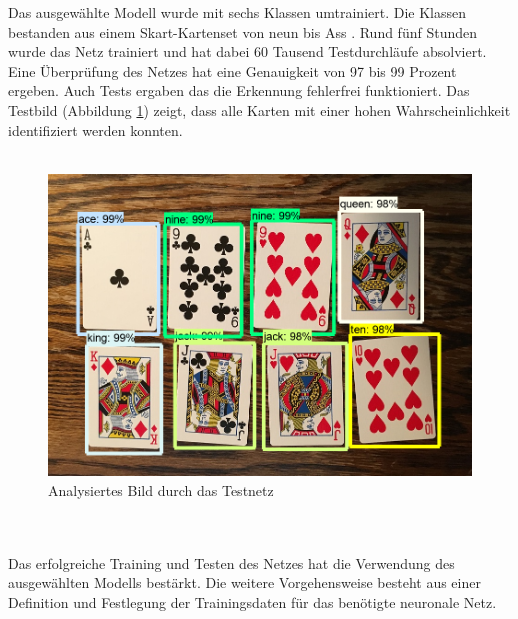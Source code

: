\documentclass[a4paper,12pt,oneside]{article}
\begin{document}
Das ausgewählte Modell wurde mit sechs Klassen umtrainiert. Die Klassen bestanden aus einem Skart-Kartenset von neun bis Ass \cite{evan2018pic}. Rund fünf Stunden wurde das Netz trainiert und hat dabei 60 Tausend Testdurchläufe absolviert. Eine Überprüfung des Netzes hat eine Genauigkeit von 97 bis 99 Prozent ergeben. Auch Tests ergaben das die Erkennung fehlerfrei funktioniert. Das Testbild (Abbildung \ref{img:Kartenset}) zeigt, dass alle Karten mit einer hohen Wahrscheinlichkeit identifiziert werden konnten.
\\
\\
\begin{figure}
    [h]
	\centering
	\includegraphics[scale=0.5]{Sources/kartenset.png}
	\caption{Analysiertes Bild durch das Testnetz}
	\label{img:Kartenset}
\end{figure}
\\
\\
Das erfolgreiche Training und Testen des Netzes hat die Verwendung des ausgewählten Modells bestärkt. Die weitere Vorgehensweise besteht aus einer Definition und Festlegung der Trainingsdaten für das benötigte neuronale Netz. 
\end{document}
